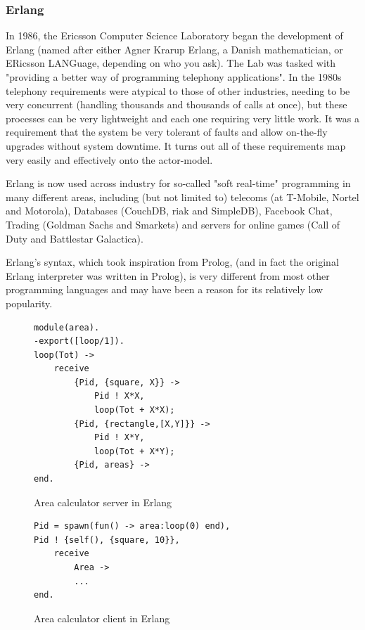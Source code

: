 \documentclass[pdftex,12pt,a4paper]{article}
\begin{document}
\subsubsection{Erlang}

In 1986, the Ericsson Computer Science Laboratory began the development of Erlang\cite{armstrong2007} (named after either Agner Krarup Erlang, a Danish mathematician, or ERicsson LANGuage, depending on who you ask).
The Lab was tasked with "providing a better way of programming telephony applications". 
In the 1980s telephony requirements were atypical to those of other industries, needing to be very concurrent (handling thousands and thousands of calls at once), but these processes can be very lightweight and each one requiring very little work.
It was a requirement that the system be very tolerant of faults and allow on-the-fly upgrades without system downtime.
It turns out all of these requirements map very easily and effectively onto the actor-model.

Erlang is now used across industry for so-called "soft real-time" programming in many different areas, including (but not limited to) telecoms (at T-Mobile, Nortel and Motorola), Databases (CouchDB, riak and SimpleDB), Facebook Chat, Trading (Goldman Sachs and Smarkets) and servers for online games (Call of Duty and Battlestar Galactica).

Erlang's syntax, which took inspiration from Prolog, (and in fact the original Erlang interpreter was written in Prolog), is very different from most other programming languages and may have been a reason for its relatively low popularity.

\begin{figure}[H]
\begin{verbatim}
module(area).
-export([loop/1]).
loop(Tot) ->
    receive
        {Pid, {square, X}} ->
            Pid ! X*X,
            loop(Tot + X*X);
        {Pid, {rectangle,[X,Y]}} ->
            Pid ! X*Y,
            loop(Tot + X*Y);
        {Pid, areas} ->
end.
\end{verbatim}
\caption{Area calculator server in Erlang}
\label{fig:example_erlang_server}
\end{figure}

\begin{figure}[H]
\begin{verbatim}
Pid = spawn(fun() -> area:loop(0) end),
Pid ! {self(), {square, 10}},
    receive
        Area ->
        ...
end.
\end{verbatim}
\caption{Area calculator client in Erlang}
\label{fig:example_erlang_client}
\end{figure}
\end{document}
